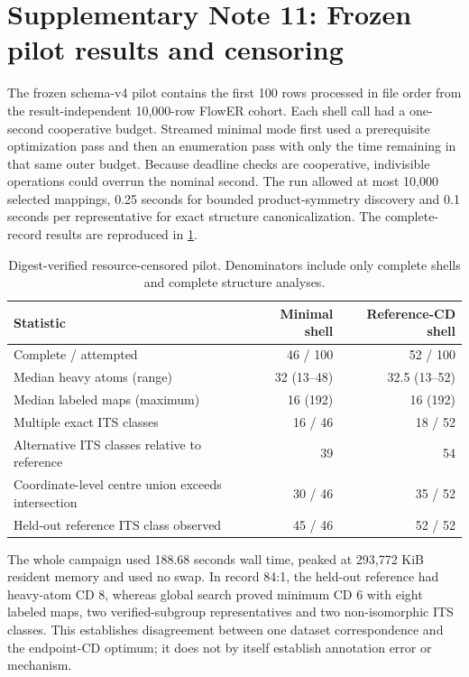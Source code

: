 \documentclass[11pt]{article}
\theoremstyle{definition}
\begin{document}
\section{Supplementary Note 11: Frozen pilot results and censoring}

The frozen schema-v4 pilot contains the first 100 rows processed in file order
from the result-independent 10,000-row FlowER cohort.  Each shell call had a
one-second cooperative budget.  Streamed minimal mode first used a prerequisite
optimization pass and then an enumeration pass with only the time remaining in
that same outer budget.  Because deadline checks are cooperative, indivisible
operations could overrun the nominal second.  The run allowed at most 10,000
selected mappings, 0.25
seconds for bounded product-symmetry discovery and 0.1 seconds per
representative for exact structure canonicalization.  The complete-record
results are reproduced in \cref{tab:si-pilot}.

\begin{table}[ht]
\centering
\caption{Digest-verified resource-censored pilot.  Denominators include only
complete shells and complete structure analyses.}
\label{tab:si-pilot}
\begin{tabular}{lrr}
\toprule
Statistic & Minimal shell & Reference-CD shell \\
\midrule
Complete / attempted & 46 / 100 & 52 / 100 \\
Median heavy atoms (range) & 32 (13--48) & 32.5 (13--52) \\
Median labeled maps (maximum) & 16 (192) & 16 (192) \\
Multiple exact ITS classes & 16 / 46 & 18 / 52 \\
Alternative ITS classes relative to reference & 39 & 54 \\
Coordinate-level centre union exceeds intersection & 30 / 46 & 35 / 52 \\
Held-out reference ITS class observed & 45 / 46 & 52 / 52 \\
\bottomrule
\end{tabular}
\end{table}

The whole campaign used 188.68 seconds wall time, peaked at 293,772 KiB
resident memory and used no swap.  In record 84:1, the held-out reference had
heavy-atom CD 8, whereas global search proved minimum CD 6 with eight labeled
maps, two verified-subgroup representatives and two non-isomorphic ITS
classes.  This establishes disagreement between one dataset correspondence
and the endpoint-CD optimum; it does not by itself establish annotation error
or mechanism.
\end{document}
